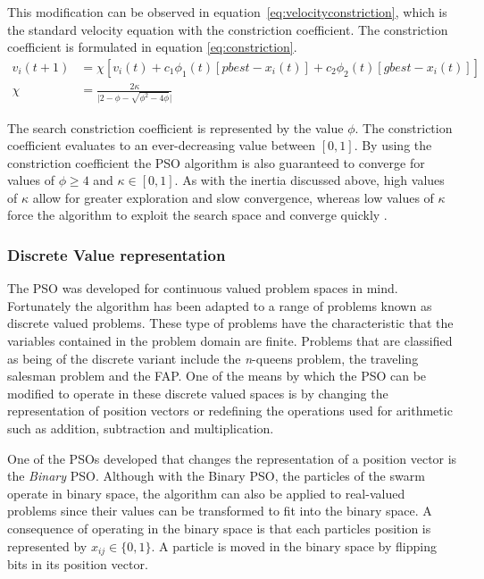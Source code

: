 This modification can be observed in equation~\ref{eq:velocityconstriction}, which is the standard velocity equation with the constriction coefficient. The constriction coefficient is formulated in equation \ref{eq:constriction}\cite{adaptPSO,FundamentalSwarm,CompuIntelligenceIntro}.
\begin{align}
v_i(t+1) &= \chi[v_i(t) + c_1\phi_{1}(t)[pbest - x_i(t)] + c_2\phi_{2}(t)[gbest - x_i(t)]]\label{eq:velocityconstriction}\\
\chi &= \frac{2\kappa}{\lvert 2 - \phi - \sqrt{\phi^2 - 4\phi}\rvert}\label{eq:constriction}
\end{align}

The search constriction coefficient is represented by the value $\phi$. The constriction coefficient evaluates to an ever-decreasing value between $[0,1]$. By using the constriction coefficient the \gls{PSO} algorithm is also guaranteed to converge for values of $\phi \geq 4$ and $\kappa \in [0,1]$. As with the inertia discussed above, high values of $\kappa$ allow for greater exploration and slow convergence, whereas low values of $\kappa$ force the algorithm to exploit the search space and converge quickly \cite{adaptPSO,FundamentalSwarm,CompuIntelligenceIntro}.

\subsubsection{Discrete Value representation}

The \gls{PSO} was developed for continuous valued problem spaces in mind\cite{CompuIntelligenceIntro,FundamentalSwarm}. Fortunately the algorithm has been adapted to a range of problems known as discrete valued problems. These type of problems have the characteristic that the variables contained in the problem domain are finite\cite{CompuIntelligenceIntro,FundamentalSwarm}. Problems that are classified as being of the discrete variant include the \emph{n}-queens problem, the traveling salesman problem and the \gls{FAP}\cite{CompuIntelligenceIntro,FundamentalSwarm}. One of the means by which the \gls{PSO} can be modified to operate in these discrete valued spaces is by changing the representation of position vectors or redefining the operations used for arithmetic such as addition, subtraction and multiplication\cite{CompuIntelligenceIntro,FundamentalSwarm}.

One of the \glspl{PSO} developed that changes the representation of a position vector is the \emph{Binary} \gls{PSO}\cite{CompuIntelligenceIntro,FundamentalSwarm}. Although with the Binary \gls{PSO}, the particles of the swarm operate in binary space, the algorithm can also be applied to real-valued problems since their values can be transformed to fit into the binary space\cite{CompuIntelligenceIntro,FundamentalSwarm}. A consequence of operating in the binary space is that each particles position is represented by $x_{ij} \in \{0,1\}$\cite{CompuIntelligenceIntro,FundamentalSwarm}. A particle is moved in the binary space by flipping bits in its position vector\cite{CompuIntelligenceIntro,FundamentalSwarm}.

